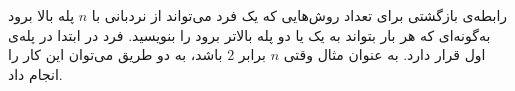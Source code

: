\EXERCISE
رابطه‌ی بازگشتی برای تعداد روش‌هایی که یک فرد می‌تواند از نردبانی با
$n$
پله بالا برود به‌گونه‌ای که هر بار بتواند به یک یا دو پله بالاتر برود را بنویسید. فرد در ابتدا در پله‌ی اول قرار دارد. به عنوان مثال وقتی
$n$
برابر
$2$
باشد، به دو طریق می‌توان این کار را انجام داد.